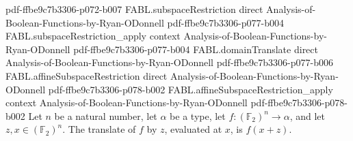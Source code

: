 \begin{theorem}
  {pdf-ffbe9c7b3306-p072-b007}
\proofstep
  {FABL.subspaceRestriction}
  {direct}
  {Analysis-of-Boolean-Functions-by-Ryan-ODonnell}
  {pdf-ffbe9c7b3306-p077-b004}
\proofstep
  {FABL.subspaceRestriction_apply}
  {context}
  {Analysis-of-Boolean-Functions-by-Ryan-ODonnell}
  {pdf-ffbe9c7b3306-p077-b004}
\proofstep
  {FABL.domainTranslate}
  {direct}
  {Analysis-of-Boolean-Functions-by-Ryan-ODonnell}
  {pdf-ffbe9c7b3306-p077-b006}
\proofstep
  {FABL.affineSubspaceRestriction}
  {direct}
  {Analysis-of-Boolean-Functions-by-Ryan-ODonnell}
  {pdf-ffbe9c7b3306-p078-b002}
\proofstep
  {FABL.affineSubspaceRestriction_apply}
  {context}
  {Analysis-of-Boolean-Functions-by-Ryan-ODonnell}
  {pdf-ffbe9c7b3306-p078-b002}
Let $n$ be a natural number, let $\alpha$ be a type, let $f:(\mathbb F_2)^n\to\alpha$,
and let $z,x\in(\mathbb F_2)^n$. The translate of $f$ by $z$, evaluated at $x$, is
$f(x+z)$.
\end{theorem}


